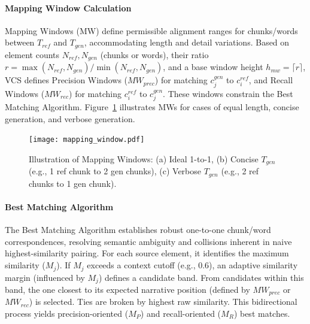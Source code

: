 \documentclass[letterpaper]{article} %
\begin{document}
\paragraph{Mapping Window Calculation}
\label{sssec:mapping_window_revised}
Mapping Windows (MW) define permissible alignment ranges for chunks/words between $T_{ref}$ and $T_{gen}$, accommodating length and detail variations. Based on element counts $N_{ref}, N_{gen}$ (chunks or words), their ratio $r = \max(N_{ref}, N_{gen}) / \min(N_{ref}, N_{gen})$, and a base window height $h_{mw} = \lceil r \rceil$, VCS defines Precision Windows ($MW_{prec}$) for matching $c_j^{gen}$ to $c_i^{ref}$, and Recall Windows ($MW_{rec}$) for matching $c_i^{ref}$ to $c_j^{gen}$. These windows constrain the Best Matching Algorithm. Figure~\ref{fig:mapping_windows} illustrates MWs for cases of equal length, concise generation, and verbose generation.

\begin{figure}[ht]
\centering
\texttt{[image: mapping\_window.pdf]}
\caption{Illustration of Mapping Windows: (a) Ideal 1-to-1, (b) Concise $T_{gen}$ (e.g., 1 ref chunk to 2 gen chunks), (c) Verbose $T_{gen}$ (e.g., 2 ref chunks to 1 gen chunk).}
\label{fig:mapping_windows}
\end{figure}

\paragraph{Best Matching Algorithm}
\label{sssec:best_matching_revised}
The Best Matching Algorithm establishes robust one-to-one chunk/word correspondences, resolving semantic ambiguity and collisions inherent in naive highest-similarity pairing. For each source element, it identifies the maximum similarity ($M_j$). If $M_j$ exceeds a context cutoff (e.g., 0.6), an adaptive similarity margin (influenced by $M_j$) defines a candidate band. From candidates within this band, the one closest to its expected narrative position (defined by $MW_{prec}$ or $MW_{rec}$) is selected. Ties are broken by highest raw similarity. This bidirectional process yields precision-oriented ($M_P$) and recall-oriented ($M_R$) best matches.
\end{document}
